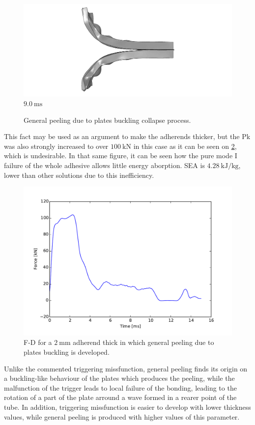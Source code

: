 \documentclass[
documentsize = a4, %
font = cmr, %
typesize = 11, %
printmode = true,
onehalfspacing = true,
language = en, %
titlepage = udciccp, %
degree = pt, %
dedication = true,
acknowledgements = true,
abstract-en = true,
abstract-es = false,
abstract-ga = false,
epigraphs = true,
toc = true,
lof = true,
lot = true,
frontmatterintoc = false,
notation = false,
minimal = false,
]{UDCthesis}
\begin{document}
\begin{figure}
	\quad
	\begin{minipage}[b]{.48\linewidth}
		\centering
		\includegraphics[width=\linewidth]{IMG_CUTRES/gppb300}
		$\SI{9.0}{\ms}$
	\end{minipage}

	\caption{General peeling due to plates buckling collapse process.}
	\label{fig:gppb}
\end{figure}

This fact may be used as an argument to make the adherends thicker, but the \acrlong{Pk} was also strongly increased to over $\SI{100}{\kN}$ in this case as it can be seen on \cref{fig:gppb_fd}, which is undesirable. In that same figure, it can be seen how the pure mode I failure of the whole adhesive allows little energy aborption. \Gls{SEA} is $\SI{4.28}{\kJ/\kg}$, lower than other solutions due to this inefficiency.

\begin{figure}
	\centering
	\includegraphics[width=0.7\linewidth]{IMG_CUTRES/gppb_fd}
	\caption{\Acrlong{F-D} for a $\SI{2}{\mm}$ adherend thick in which general peeling due to plates buckling is developed.}
	\label{fig:gppb_fd}
\end{figure}

Unlike the commented triggering missfunction, general peeling finds its origin on a buckling-like behaviour of the plates which produces the peeling, while the malfunction of the trigger leads to local failure of the bonding, leading to the rotation of a part of the plate arround a wave formed in a rearer point of the tube. In addition, triggering missfunction is easier to develop with lower thickness values, while general peeling is produced with higher values of this parameter.
\end{document}
